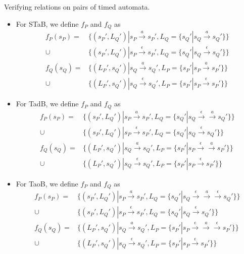 \documentclass{beamer}
\begin{document}
\begin{frame}[shrink=20]{Verifying relations on pairs of timed automata.}
  \begin{itemize}
  \item For STaB, we define $f_P$ and $f_Q$ as
    \begin{align*}
      f_P(s_P) = & \{(s_P', L_Q') | s_P \xrightarrow{a} s_P', 
      L_Q=\{ s_Q' | s_Q \xrightarrow{a} s_Q'\}\} \\
      \cup & \{(s_P', L_Q') | s_P \xrightarrow{\epsilon} s_P', 
      L_Q=\{ s_Q' | s_Q \xrightarrow{\epsilon} s_Q'\}\} \\
      f_Q(s_Q) = & \{(L_P', s_Q') | s_Q \xrightarrow{a} s_Q', 
      L_P=\{ s_P' | s_P \xrightarrow{a} s_P'\}\} \\
      \cup & \{(L_P', s_Q') | s_Q \xrightarrow{\epsilon} s_Q', 
      L_P=\{ s_P' | s_P \xrightarrow{\epsilon} s_P'\}\} 
    \end{align*}

  \item For TadB, we define $f_P$ and $f_Q$ as
    \begin{align*}
      f_P(s_P) = & \{(s_P', L_Q') | s_P \xrightarrow{a} s_P', 
      L_Q=\{ s_Q' | s_Q \xrightarrow{\epsilon}\xrightarrow{a} s_Q'\}\} \\
      \cup & \{(s_P', L_Q') | s_P \xrightarrow{\epsilon} s_P', 
      L_Q=\{ s_Q' | s_Q \xrightarrow{\epsilon} s_Q'\}\} \\
      f_Q(s_Q) = & \{(L_P', s_Q') | s_Q \xrightarrow{a} s_Q', 
      L_P=\{ s_P' | s_P \xrightarrow{\epsilon}\xrightarrow{a} s_P'\}\} \\
      \cup & \{(L_P', s_Q') | s_Q \xrightarrow{\epsilon} s_Q', 
      L_P=\{ s_P' | s_P \xrightarrow{\epsilon} s_P'\}\} 
    \end{align*}

  \item For TaoB, we define $f_P$ and $f_Q$ as
    \begin{align*}
      f_P(s_P) = & \{(s_P', L_Q') | s_P \xrightarrow{a} s_P', 
      L_Q=\{ s_Q' | s_Q \xrightarrow{\epsilon}\xrightarrow{a}\xrightarrow{\epsilon} s_Q'\}\} \\
      \cup & \{(s_P', L_Q') | s_P \xrightarrow{\epsilon} s_P', 
      L_Q=\{ s_Q' | s_Q \xrightarrow{\epsilon} s_Q'\}\} \\
      f_Q(s_Q) = & \{(L_P', s_Q') | s_Q \xrightarrow{a} s_Q', 
      L_P=\{ s_P' | s_P \xrightarrow{\epsilon}\xrightarrow{a}\xrightarrow{\epsilon} s_P'\}\} \\
      \cup & \{(L_P', s_Q') | s_Q \xrightarrow{\epsilon} s_Q', 
      L_P=\{ s_P' | s_P \xrightarrow{\epsilon} s_P'\}\} 
    \end{align*}

  \end{itemize}
\end{frame}
\end{document}
